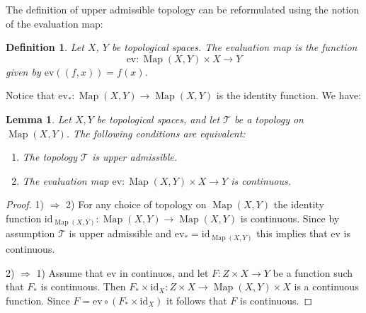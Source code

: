 \documentclass[11pt, letterpaper, oneside]{report}
\theoremstyle{pplain}
\newtheorem{lemma}[theorem]{Lemma}
\newtheorem{ITERMVALUE THM}[theorem]{Intermediate Value Theorem}
\newtheorem{HEINEBOREL THM}[theorem]{Heine-Borel Theorem}
\newtheorem{UMETR THM}[theorem]{Urysohn Metrization Theorem}
\newtheorem{UMETR2 THM}[theorem]{Urysohn Metrization Theorem (v.2)}
\theoremstyle{ddefinition}
\newtheorem{definition}[theorem]{Definition}
\theoremstyle{nnn}
\newtheorem{TDA NN}[theorem]{Topological Data Analysis. }
\theoremstyle{eexercise}
\newcommand{\Ra}{\Rightarrow}
\newcommand{\Map}{\operatorname{Map}}
\newcommand{\ev}{\mathrm{ev}}
\newcommand{\id}{\mathrm{id}}
\newcommand{\TT}{{\mathcal T}}
\begin{document}
The definition of upper admissible topology can be reformulated using the notion of the  evaluation map:

\begin{definition}
Let $X$, $Y$ be topological spaces. The \emph{evaluation map} is the function 
$$\ev\colon \Map(X, Y) \times X \to Y$$
given by $\ev((f, x)) = f(x)$.
\end{definition}

Notice that $\ev_{\ast}\colon \Map(X, Y) \to \Map(X, Y)$ is the identity function. We have:


\begin{lemma}
\label{ADMISSIBLE TOP EV MAP LEMMA}
Let $X, Y$ be topological spaces, and let $\TT$  be a topology on $\Map(X, Y)$.
The following conditions are equivalent:
\begin{enumerate}
\item The topology $\TT$ is upper admissible. 
\item The evaluation map  $\ev\colon \Map(X, Y) \times X \to Y$ is continuous. 
\end{enumerate}
\end{lemma}

\begin{proof}
1) $\Ra$ 2)  For any choice of topology 
on $\Map(X, Y)$ the identity function $\id_{\Map(X, Y)}\colon \Map(X, Y)\to \Map(X, Y)$ is continuous. 
Since by assumption $\TT$ is upper admissible  and  $\ev_{\ast} = \id_{\Map(X, Y)}$  this implies that  $\ev$ is continuous. 


2) $\Ra$ 1) Assume that $\ev$ in continuos, and let  $F\colon Z\times X \to Y$ be a function such that 
$F_{\ast}$ is continuous. Then  $F_{\ast}\times \id_{X}\colon Z \times X \to  \Map(X, Y)\times X$ is a continuous function. 
Since $F = \ev\circ(F_{\ast}\times \id_{X})$ it follows that $F$ is continuous. 
\end{proof}
\end{document}
